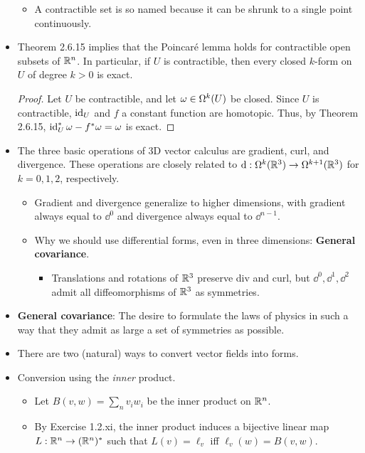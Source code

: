 \documentclass[../notes.tex]{subfiles}
\begin{document}
\begin{itemize}
    \begin{itemize}
        \item A contractible set is so named because it can be shrunk to a single point continuously.
    \end{itemize}
    \item Theorem 2.6.15 implies that the Poincar\'{e} lemma holds for contractible open subsets of $\R^n$. In particular, if $U$ is contractible, then every closed $k$-form on $U$ of degree $k>0$ is exact.
    \begin{proof}
        Let $U$ be contractible, and let $\omega\in\ome[k]{U}$ be closed. Since $U$ is contractible, $\id_U$ and $f$ a constant function are homotopic. Thus, by Theorem 2.6.15, $\id_U^*\omega-f^*\omega=\omega$ is exact.
    \end{proof}
    \item The three basic operations of 3D vector calculus are gradient, curl, and divergence. These operations are closely related to $\dd:\ome[k]{\R^3}\to\ome[k+1]{\R^3}$ for $k=0,1,2$, respectively.
    \begin{itemize}
        \item Gradient and divergence generalize to higher dimensions, with gradient always equal to $\dd^0$ and divergence always equal to $\dd^{n-1}$.
        \item Why we should use differential forms, even in three dimensions: \textbf{General covariance}.
        \begin{itemize}
            \item Translations and rotations of $\R^3$ preserve div and curl, but $\dd^0,\dd^1,\dd^2$ admit all diffeomorphisms of $\R^3$ as symmetries.
        \end{itemize}
    \end{itemize}
    \item \textbf{General covariance}: The desire to formulate the laws of physics in such a way that they admit as large a set of symmetries as possible.
    \item There are two (natural) ways to convert vector fields into forms.
    \item Conversion using the \emph{inner} product.
    \begin{itemize}
        \item Let $B(v,w)=\sum_nv_iw_i$ be the inner product on $\R^n$.
        \item By Exercise 1.2.xi, the inner product induces a bijective linear map $L:\R^n\to(\R^n)^*$ such that $L(v)=\ell_v$ iff $\ell_v(w)=B(v,w)$.

\end{itemize}
\end{itemize}
\end{document}
